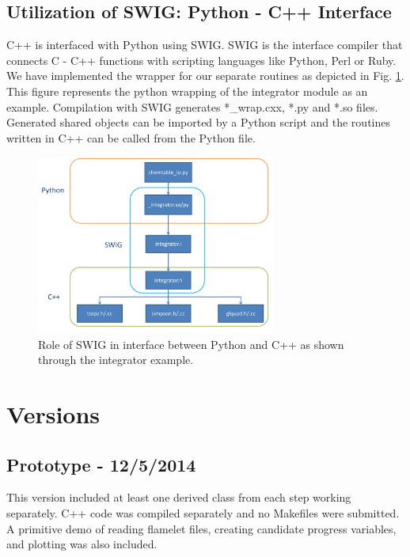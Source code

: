 \documentclass[11pt]{article}
\begin{document}
\subsection{Utilization of SWIG: Python - C++ Interface}
C++ is interfaced with Python using SWIG. SWIG is the interface
compiler that connects C - C++ functions with scripting languages like
Python, Perl or Ruby. We have implemented the wrapper for our separate
routines as depicted in Fig.  \ref{fig:swig}. This figure represents
the python wrapping of the integrator module as an
example. Compilation with SWIG generates *\_wrap.cxx, *.py and *.so
files. Generated shared objects can be imported by a Python script and
the routines written in C++ can be called from the Python file.

\begin{figure} [h]
\centering
\includegraphics[width=0.7\textwidth]{python_swig_c++}
\caption{\label{fig:swig} Role of SWIG in interface between Python and C++ as shown through the integrator example.}
\end{figure}


\section{Versions}

\subsection{Prototype - 12/5/2014}
This version included at least one derived class from each step working separately. C++ code was compiled separately and no Makefiles were submitted. A primitive demo of reading flamelet files, creating candidate progress variables, and plotting was also included.
\\
\end{document}
